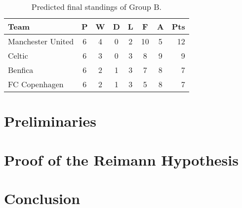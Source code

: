 \documentclass[12pt,oneside,letterpaper]{report}
\begin{document}
\begin{table}
  \centering
  \caption{Predicted final standings of Group B.}
  \begin{tabular}{l*{6}{c}r}
    Team              & P & W & D & L & F  & A & Pts \\
    \hline
    Manchester United & 6 & 4 & 0 & 2 & 10 & 5 & 12  \\
    Celtic            & 6 & 3 & 0 & 3 &  8 & 9 &  9  \\
    Benfica           & 6 & 2 & 1 & 3 &  7 & 8 &  7  \\
    FC Copenhagen     & 6 & 2 & 1 & 3 &  5 & 8 &  7  \\
  \end{tabular}
  \label{tab-forecast}
\end{table}

\lipsum[5-7]

\chapter{Preliminaries}
\label{chp-preliminaries}

% 
\lipsum

\chapter{Proof of the Reimann Hypothesis}
\label{chp-proof}

% 
\lipsum

\chapter{Conclusion}
\label{chp-conclusion}

% 
\lipsum


% 
%
%
%
%


\end{document}
